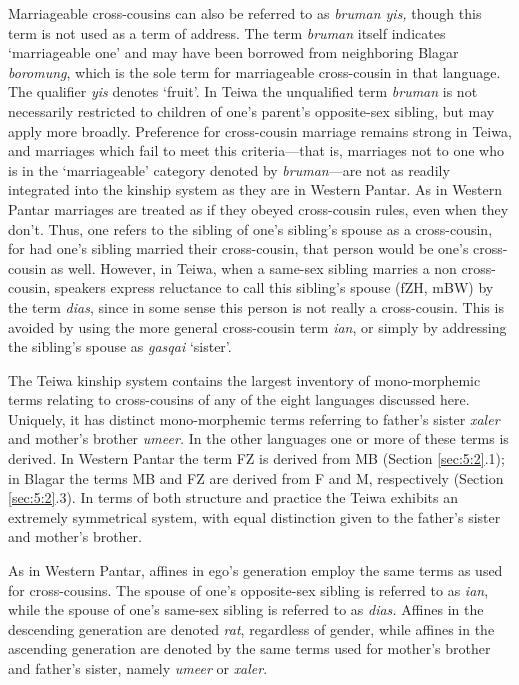 Marriageable cross-cousins can also be referred to as \textit{bruman yis,} though this term is not used as a term of address. The term \textit{bruman} itself indicates `marriageable one' and may have been borrowed from neighboring Blagar \textit{boromung}, which is the sole term for marriageable cross-cousin in that language. The qualifier \textit{yis} denotes `fruit'. In Teiwa the unqualified term \textit{bruman} is not necessarily restricted to children of one's parent's opposite-sex sibling, but may apply more broadly. Preference for cross-cousin marriage remains strong in Teiwa, and marriages which fail to meet this criteria---that is, marriages not to one who is in the `marriageable' category denoted by \textit{bruman}{}---are not as readily integrated into the kinship system as they are in Western Pantar. As in Western Pantar marriages are treated as if they obeyed cross-cousin rules, even when they don't. Thus, one refers to the sibling of one's sibling's spouse as a cross-cousin, for had one's sibling married their cross-cousin, that person would be one's cross-cousin as well. However, in Teiwa, when a same-sex sibling marries a non cross-cousin, speakers express reluctance to call this sibling's spouse (fZH, mBW) by the term \textit{dias}, since in some sense this person is not really a cross-cousin. This is avoided by using the more general cross-cousin term \textit{ian}, or simply by addressing the sibling's spouse as \textit{gasqai} `sister'. 

The Teiwa kinship system contains the largest inventory of mono-morphemic terms relating to cross-cousins of any of the eight languages discussed here. Uniquely, it has distinct mono-morphemic terms referring to father's sister \textit{xaler} and mother's brother \textit{umeer.} In the other languages one or more of these terms is derived. In Western Pantar the term FZ is derived from MB (Section \ref{sec:5:2}.1); in Blagar the terms MB and FZ are derived from F and M, respectively (Section \ref{sec:5:2}.3). In terms of both structure and practice the Teiwa exhibits an extremely symmetrical system, with equal distinction given to the father's sister and mother's brother. 

As in Western Pantar, affines in ego's generation employ the same terms as used for cross-cousins. The spouse of one's opposite-sex sibling is referred to as \textit{ian}, while the spouse of one's same-sex sibling is referred to as \textit{dias.} Affines in the descending generation are denoted \textit{rat}, regardless of gender, while affines in the ascending generation are denoted by the same terms used for mother's brother and father's sister, namely \textit{umeer} or \textit{xaler}. 


